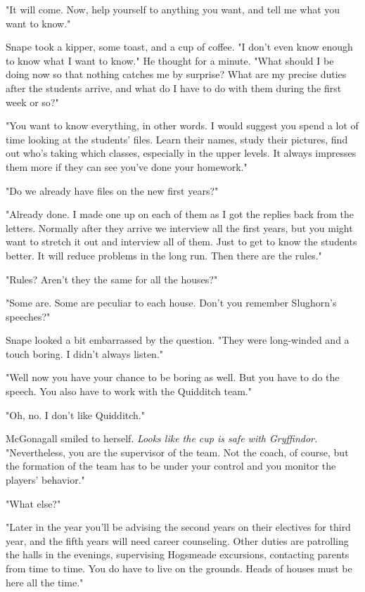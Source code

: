 "It will come. Now, help yourself to anything you want, and tell me what you want to know."

Snape took a kipper, some toast, and a cup of coffee. "I don't even know enough to know what I want to know." He thought for a minute. "What should I be doing now so that nothing catches me by surprise? What are my precise duties after the students arrive, and what do I have to do with them during the first week or so?"

"You want to know everything, in other words. I would suggest you spend a lot of time looking at the students' files. Learn their names, study their pictures, find out who's taking which classes, especially in the upper levels. It always impresses them more if they can see you've done your homework."

"Do we already have files on the new first years?"

"Already done. I made one up on each of them as I got the replies back from the letters. Normally after they arrive we interview all the first years, but you might want to stretch it out and interview all of them. Just to get to know the students better. It will reduce problems in the long run. Then there are the rules."

"Rules? Aren't they the same for all the houses?"

"Some are. Some are peculiar to each house. Don't you remember Slughorn's speeches?"

Snape looked a bit embarrassed by the question. "They were long-winded and a touch{\el} boring. I didn't always listen."

"Well now you have your chance to be boring as well. But you have to do the speech. You also have to work with the Quidditch team."

"Oh, no. I don't like Quidditch."

McGonagall smiled to herself. \emph{Looks like the cup is safe with Gryffindor.} "Nevertheless, you are the supervisor of the team. Not the coach, of course, but the formation of the team has to be under your control and you monitor the players' behavior."

"What else?"

"Later in the year you'll be advising the second years on their electives for third year, and the fifth years will need career counseling. Other duties are patrolling the halls in the evenings, supervising Hogsmeade excursions, contacting parents from time to time. You do have to live on the grounds. Heads of houses must be here all the time."


